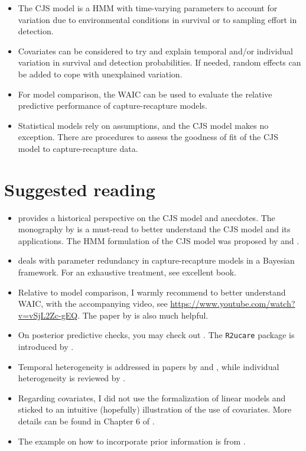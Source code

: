 \documentclass[
  12pt,
]{krantz}
\begin{document}
\begin{itemize}
\item
  The CJS model is a HMM with time-varying parameters to account for variation due to environmental conditions in survival or to sampling effort in detection.
\item
  Covariates can be considered to try and explain temporal and/or individual variation in survival and detection probabilities. If needed, random effects can be added to cope with unexplained variation.
\item
  For model comparison, the WAIC can be used to evaluate the relative predictive performance of capture-recapture models.
\item
  Statistical models rely on assumptions, and the CJS model makes no exception. There are procedures to assess the goodness of fit of the CJS model to capture-recapture data.
\end{itemize}

\section{Suggested reading}\label{suggested-reading-3}

\begin{itemize}
\item
  \citet{buckland2016} provides a historical perspective on the CJS model and anecdotes. The monography by \citet{LebretonEtAl1992} is a must-read to better understand the CJS model and its applications. The HMM formulation of the CJS model was proposed by \citet{gimenez2007} and \citet{royle2008}.
\item
  \citet{gimenez2009} deals with parameter redundancy in capture-recapture models in a Bayesian framework. For an exhaustive treatment, see \citet{cole2020} excellent book.
\item
  Relative to model comparison, I warmly recommend \citet{mcelreathbook} to better understand WAIC, with the accompanying video, see \url{https://www.youtube.com/watch?v=vSjL2Zc-gEQ}. The paper by \citet{gelman2004} is also much helpful.
\item
  On posterior predictive checks, you may check out \citet{conn2018}. The \texttt{R2ucare} package is introduced by \citet{gimenez2018r2ucare}.
\item
  Temporal heterogeneity is addressed in papers by \citet{grosbois_assessing_2008} and \citet{frederiksen2014}, while individual heterogeneity is reviewed by \citet{gimenez2018ih}.
\item
  Regarding covariates, I did not use the formalization of linear models and sticked to an intuitive (hopefully) illustration of the use of covariates. More details can be found in Chapter 6 of \citet{cooch2017intromark}.
\item
  The example on how to incorporate prior information is from \citet{mccarthy2005}.
\end{itemize}
\end{document}
